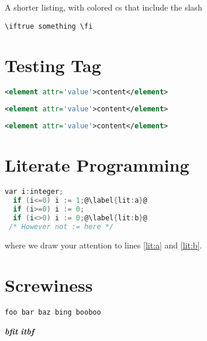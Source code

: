 \documentclass{article}
\begin{document}
A shorter listing, with colored cs that include the slash
\begin{lstlisting}[language={[LaTeX]TeX},texcsstyle=*{\color{blue}\bfseries}]
  \iftrue something \fi
\end{lstlisting}

\section{Testing Tag}
\begin{lstlisting}[language=XML,tagstyle=\bf]
<element attr='value'>content</element>
\end{lstlisting}
\begin{lstlisting}[language=XML,tagstyle=\bf,usekeywordsintag=false]
<element attr='value'>content</element>
\end{lstlisting}
\begin{lstlisting}[language=XML,tagstyle=\bf,markfirstintag]
<element attr='value'>content</element>
\end{lstlisting}

\section{Literate Programming}
\begin{lstlisting}[language=C,escapechar=@,literate=*{:=}{{$\gets$}}1 {<=}{{$\leq$}}1 {>=}{{$\geq$}}1 {<>}{{$\neq$}}1]
  var i:integer;
  if (i<=0) i := 1;@\label{lit:a}@
  if (i>=0) i := 0;
  if (i<>0) i := 0;@\label{lit:b}@
 /* However not := here */
\end{lstlisting}
where we draw your attention to lines \ref{lit:a} and \ref{lit:b}.

\section{Screwiness}
\begin{lstlisting}[language=bingo,keywordstyle=\bfseries,keywordstyle={[2]\itshape},index={[1][keywords2]{bar,baz}}]
foo bar baz bing booboo
\end{lstlisting}
{\bfseries\itshape bfit}
{\itshape\bfseries itbf}
\printindex
\end{document}
